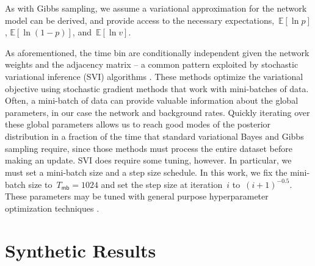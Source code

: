 As with Gibbs sampling, we assume a variational approximation for the network model can be derived, and provide access to the necessary expectations,~$\mathbb{E}[\ln p]$, $\mathbb{E}[\ln(1-p)]$, and~$\mathbb{E}[\ln v]$. 

As aforementioned, the time bin are conditionally independent given the network weights and the adjacency matrix -- a common pattern exploited by stochastic variational inference (SVI) algorithms \cite{Hoffman-2013}.
These methods optimize the variational objective using stochastic gradient methods that work with mini-batches of data.
Often, a mini-batch of data can provide valuable information about the global parameters, in our case the network and background rates. 
Quickly iterating over these global parameters allows us to reach good modes of the posterior distribution in a fraction of the time that standard variational Bayes and Gibbs sampling require, since those methods must process the entire dataset before making an update.
SVI does require some tuning, however. In particular, we must set a mini-batch size and a step size schedule.
In this work, we fix the mini-batch size to~${T_{\mathsf{mb}}=1024}$ and set the  step size at iteration~$i$ to~${(i+1)^{-0.5}}$.
These parameters may be  tuned with general purpose hyperparameter optimization techniques \cite{Snoek-2012}.

\section{Synthetic Results}

